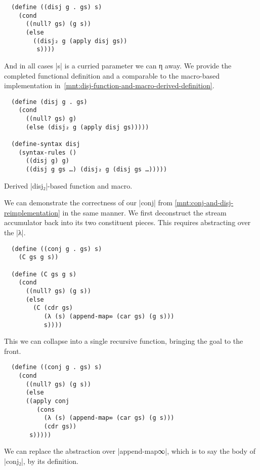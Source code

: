 \documentclass[sigplan,screen,draft,anonymous,review,natbib=false]{acmart}
\begin{document}
\begin{verbatim}
  (define ((disj g . gs) s)
    (cond
      ((null? gs) (g s))
      (else
        ((disj₂ g (apply disj gs))
         s))))
\end{verbatim}

And in all cases \rackinline|s| is a curried parameter we can η away.
We provide the completed functional definition and a comparable to the
macro-based implementation
in~\cref{mnt:disj-function-and-macro-derived-definition}.

\begin{listing}
\begin{verbatim}
  (define (disj g . gs)
    (cond
      ((null? gs) g)
      (else (disj₂ g (apply disj gs)))))

  (define-syntax disj
    (syntax-rules ()
      ((disj g) g)
      ((disj g gs …) (disj₂ g (disj gs …)))))
\end{verbatim}
  \caption{Derived \rackinline|disj₂|-based function and macro.}
  \label{mnt:disj-function-derived-definition}
\end{listing}

We can demonstrate the correctness of our \rackinline|conj| from
\cref{mnt:conj-and-disj-reimplementation} in the same manner. We first
deconstruct the stream accumulator back into its two constituent
pieces. This requires abstracting over the \rackinline|λ|.

\begin{verbatim}
  (define ((conj g . gs) s)
    (C gs g s))

  (define (C gs g s)
    (cond
      ((null? gs) (g s))
      (else
        (C (cdr gs)
           (λ (s) (append-map∞ (car gs) (g s)))
           s))))
\end{verbatim}

This we can collapse into a single recursive function, bringing the
goal to the front.

\begin{verbatim}
  (define ((conj g . gs) s)
    (cond
      ((null? gs) (g s))
      (else
      ((apply conj
         (cons
           (λ (s) (append-map∞ (car gs) (g s)))
           (cdr gs))
       s)))))
\end{verbatim}

We can replace the abstraction over \rackinline|append-map∞|, which is
to say the body of \rackinline|conj₂|, by its definition.
\end{document}

